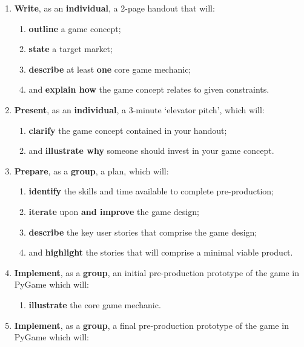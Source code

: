 \documentclass{../fal_assignment}
\begin{document}
\begin{enumerate}[label=(\Alph*)]
    \item \textbf{Write}, as an \textbf{individual}, a 2-page handout that will:
    	\begin{enumerate}[label=\roman*.]
    		\item \textbf{outline} a game concept;
    		\item \textbf{state} a target market;
    		\item \textbf{describe} at least \textbf{one} core game mechanic;
    		\item and \textbf{explain how} the game concept relates to given constraints.
	\end{enumerate}
    \item \textbf{Present}, as an \textbf{individual}, a 3-minute `elevator pitch', which will:
    	\begin{enumerate}[label=\roman*.]
    		\item \textbf{clarify} the game concept contained in your handout;
    		\item and \textbf{illustrate why} someone should invest in your game concept.
	\end{enumerate}
    \item \textbf{Prepare}, as a \textbf{group}, a plan, which will:
    	\begin{enumerate}[label=\roman*.]
    	    	\item \textbf{identify} the skills and time available to complete pre-production;
    	    	\item \textbf{iterate} upon \textbf{and improve} the game design;
    		\item \textbf{describe} the key user stories that comprise the game design;
    		\item and \textbf{highlight} the stories that will comprise a minimal viable product.
	\end{enumerate}
    \item \textbf{Implement}, as a \textbf{group}, an initial pre-production prototype of the game in PyGame which will:
    	\begin{enumerate}[label=\roman*.]
    		\item \textbf{illustrate} the core game mechanic.
	\end{enumerate}
    \item \textbf{Implement}, as a \textbf{group}, a final pre-production prototype of the game in PyGame which will:
    	\begin{enumerate}[label=\roman*.]

\end{enumerate}
\end{enumerate}
\end{document}
